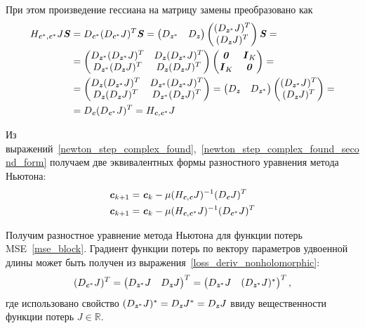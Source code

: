При этом произведение гессиана на матрицу замены преобразовано как
\begin{align}
	H_{\textbf{\textit{c}}^*,\textbf{\textit{c}}^*}J\textbf{\textit{S}}&=D_{\textbf{\textit{c}}^*}(D_{\textbf{\textit{c}}^*}J)^T\textbf{\textit{S}}=
	\begin{pmatrix}
		D_{\textbf{\textit{z}}^*} & D_{\textbf{\textit{z}}}
	\end{pmatrix}
	\begin{pmatrix}
		(D_{\textbf{\textit{z}}^*}J)^T \\ (D_{\textbf{\textit{z}}}J)^T
	\end{pmatrix}\textbf{\textit{S}}= \nonumber \\
	&=\begin{pmatrix}
		D_{\textbf{\textit{z}}^*}(D_{\textbf{\textit{z}}^*}J)^T & D_{\textbf{\textit{z}}}(D_{\textbf{\textit{z}}^*}J)^T \\
		D_{\textbf{\textit{z}}^*}(D_{\textbf{\textit{z}}}J)^T & D_{\textbf{\textit{z}}}(D_{\textbf{\textit{z}}}J)^T
	\end{pmatrix}
	\begin{pmatrix}
		\textbf{\textit{0}} & \textbf{\textit{I}}_K \\
		\textbf{\textit{I}}_K & \textbf{\textit{0}}
	\end{pmatrix}= \nonumber \\
	&=\begin{pmatrix}
		 D_{\textbf{\textit{z}}}(D_{\textbf{\textit{z}}^*}J)^T & D_{\textbf{\textit{z}}^*}(D_{\textbf{\textit{z}}^*}J)^T \\
		 D_{\textbf{\textit{z}}}(D_{\textbf{\textit{z}}}J)^T & D_{\textbf{\textit{z}}^*}(D_{\textbf{\textit{z}}}J)^T
	\end{pmatrix}=
	\begin{pmatrix}
		D_{\textbf{\textit{z}}} & D_{\textbf{\textit{z}}^*}
	\end{pmatrix}
	\begin{pmatrix}
		(D_{\textbf{\textit{z}}^*}J)^T \\ (D_{\textbf{\textit{z}}}J)^T
	\end{pmatrix}= \nonumber \\
	&=D_{\textbf{\textit{c}}}(D_{\textbf{\textit{c}}^*}J)^T=H_{\textbf{\textit{c}},\textbf{\textit{c}}^*}J
	\label{swap_matrix_hess_transform}
\end{align}

Из выражений~\eqref{newton_step_complex_found},~\eqref{newton_step_complex_found_second_form} получаем две эквивалентных формы разностного уравнения метода Ньютона:
\begin{align}
	&\textbf{\textit{c}}_{k+1}=\textbf{\textit{c}}_{k}-\mu(H_{\textbf{\textit{c}}, \textbf{\textit{c}}}J)^{-1}(D_{\textbf{\textit{c}}}J)^T \\
	&\textbf{\textit{c}}_{k+1}=\textbf{\textit{c}}_{k}-\mu(H_{\textbf{\textit{c}}, \textbf{\textit{c}}^*}J)^{-1}(D_{\textbf{\textit{c}}^*}J)^T
	\label{newton_method_full}
\end{align}

Получим разностное уравнение метода Ньютона для функции потерь MSE~\eqref{mse_block}. Градиент функции потерь по вектору параметров удвоенной длины может быть получен из выражения~\eqref{loss_deriv_nonholomorphic}:
\begin{equation}
	(D_{\textbf{\textit{c}}^*}J)^T=\begin{pmatrix}
		D_{\textbf{\textit{z}}^*}J & D_{\textbf{\textit{z}}}J
	\end{pmatrix}^T=\begin{pmatrix}
		D_{\textbf{\textit{z}}^*}J & (D_{\textbf{\textit{z}}^*}J)^*
	\end{pmatrix}^T,
	\label{gradient_complex_double}
\end{equation}
где использовано свойство $(D_{\textbf{\textit{z}}^*}J)^*=D_{\textbf{\textit{z}}}J^*=D_{\textbf{\textit{z}}}J$ ввиду вещественности функции потерь $J\in\mathbb{R}$.

